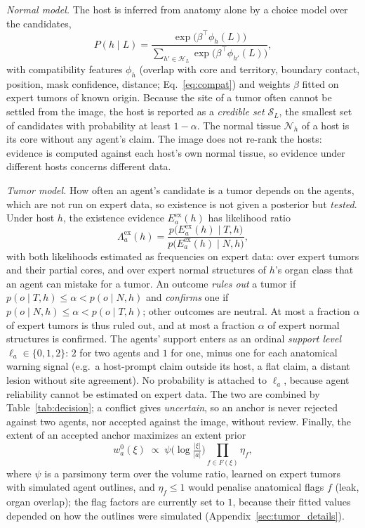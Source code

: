 \documentclass[fleqn,10pt]{olplainarticle}
\begin{document}
\emph{Normal model.} The host is inferred from anatomy alone by a choice model over the candidates,
\begin{equation}
\label{eq:normal_model}
P(h\mid L)=\frac{\exp\bigl(\beta^\top\phi_h(L)\bigr)}{\sum_{h'\in\mathcal{H}_{L}}\exp\bigl(\beta^\top\phi_{h'}(L)\bigr)},
\end{equation}
with compatibility features $\phi_h$ (overlap with core and territory, boundary contact, position, mask confidence, distance;
Eq.~\eqref{eq:compat}) and weights $\beta$ fitted on expert tumors of known origin. Because the site of a tumor often cannot
be settled from the image, the host is reported as a \emph{credible set} $\mathcal{S}_L$, the smallest set of candidates
with probability at least $1-\alpha$. The normal tissue $\mathcal{N}_h$ of a host is its core without any agent's claim. The image does not re-rank the hosts:
evidence is computed against each host's own normal tissue, so evidence under different hosts concerns different data.

\emph{Tumor model.} How often an agent's candidate is a tumor depends on the agents, which are not run on expert data, so
existence is not given a posterior but \emph{tested}. Under host $h$, the existence evidence $E^{\mathrm{ex}}_a(h)$ has
likelihood ratio
\begin{equation}
\label{eq:likelihood_ratios}
\Lambda^{\mathrm{ex}}_a(h)=\frac{p\bigl(E^{\mathrm{ex}}_a(h)\mid T,h\bigr)}{p\bigl(E^{\mathrm{ex}}_a(h)\mid N,h\bigr)},
\end{equation}
with both likelihoods estimated as frequencies on expert data: over expert tumors and their partial cores, and over expert
normal structures of $h$'s organ class that an agent can mistake for a tumor. An outcome \emph{rules out} a tumor if
$p(o\mid T,h)\le\alpha<p(o\mid N,h)$ and \emph{confirms} one if $p(o\mid N,h)\le\alpha<p(o\mid T,h)$; other outcomes
are neutral. At most a fraction $\alpha$ of expert tumors is thus ruled out, and at most a fraction $\alpha$ of expert normal
structures is confirmed. The agents'
support enters as an ordinal \emph{support level} $\ell_a\in\{0,1,2\}$: $2$ for two agents and $1$ for one, minus one for each
anatomical warning signal (e.g.\ a host-prompt claim outside its host, a flat claim, a distant lesion without site
agreement). No probability is attached to $\ell_a$, because agent reliability cannot be estimated on expert data. The two are
combined by Table~\ref{tab:decision}; a conflict gives \emph{uncertain}, so an anchor is never rejected against two agents, nor
accepted against the image, without review. Finally, the extent of an accepted anchor maximizes an extent prior
\begin{equation}
\label{eq:extent_prior}
w^0_a(\xi)\;\propto\;\psi\bigl(\log\tfrac{|\xi|}{|a|}\bigr)\prod_{f\in F(\xi)}\eta_f,
\end{equation}
where $\psi$ is a parsimony term over the volume ratio, learned on expert tumors with simulated agent outlines, and
$\eta_f\le1$ would penalise anatomical flags $f$ (leak, organ overlap); the flag factors are currently set to $1$, because
their fitted values depended on how the outlines were simulated (Appendix~\ref{sec:tumor_details}).
\end{document}
